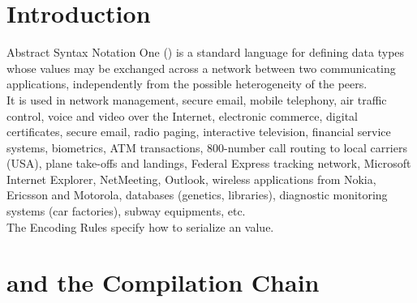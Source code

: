 \documentclass[12pt]{article}
\begin{document}
\section{Introduction}
\begin{slide}

Abstract Syntax Notation One (\ASN) is a standard language for
defining data types whose values may be exchanged across a network
between two communicating applications, independently from the
possible heterogeneity of the peers.\\

It is used in network management, secure email, mobile
telephony, air traffic control, voice and video over
the Internet, electronic commerce, digital certificates, secure email,
radio paging, interactive television, financial service systems,
biometrics, ATM transactions, 800-number call routing to local
carriers (USA), plane take-offs and landings, Federal Express tracking
network, Microsoft Internet Explorer, NetMeeting, Outlook, wireless
applications from Nokia, Ericsson and Motorola, databases (genetics,
libraries), diagnostic monitoring systems (car factories), subway
equipments, etc.\\

The Encoding Rules specify how to serialize an \ASN value.

\end{slide}


\section{\ASN and the Compilation Chain}
\begin{slide}

\epsfxsize=17cm

\end{slide}
\end{document}
